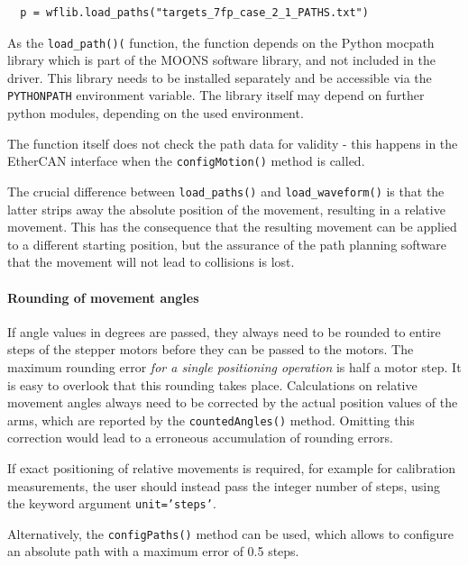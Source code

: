\documentclass[11pt,a4paper]{scrartcl}
\begin{document}
\begin{verbatim}
  p = wflib.load_paths("targets_7fp_case_2_1_PATHS.txt")
\end{verbatim}

As the \texttt{load\_path()(} function, the function depends on the
Python mocpath library which is part of the MOONS software library,
and not included in the driver.  This library needs to be installed
separately and be accessible via the \texttt{PYTHONPATH} environment
variable. The library itself may depend on further python modules,
depending on the used environment.

The function itself does not check the path data for validity - this
happens in the EtherCAN interface when the \texttt{configMotion()} method is
called.

The crucial difference between \texttt{load\_paths()} and
\texttt{load\_waveform()} is that the latter strips away the absolute
position of the movement, resulting in a relative movement.  This has
the consequence that the resulting movement can be applied to a
different starting position, but the assurance of the path planning
software that the movement will not lead to collisions is lost.


\paragraph{Rounding of movement angles}
%
%
If angle values in degrees are passed, they always need to be rounded
to entire steps of the stepper motors before they can be passed to the
motors.  The maximum rounding error \emph{for a single positioning
  operation} is half a motor step.  It is easy to overlook that this
rounding takes place.  Calculations on relative movement angles always
need to be corrected by the actual position values of the arms, which
are reported by the \texttt{countedAngles()} method. Omitting this
correction would lead to a erroneous accumulation of rounding errors.

If exact positioning of relative movements is required, for example
for calibration measurements, the user should instead pass the integer
number of steps, using the keyword argument \texttt{unit='steps'}.

Alternatively, the \texttt{configPaths()} method can be used, which
allows to configure an absolute path with a maximum error of 0.5
steps.
\end{document}
